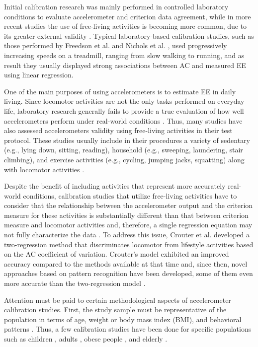 \documentclass[12pt]{article}
\begin{document}
Initial calibration research was mainly performed in controlled laboratory conditions to evaluate accelerometer and criterion data agreement, while in more recent studies the use of free-living activities is becoming more common, due to its greater external validity . Typical laboratory-based calibration studies, such as those performed by Freedson et al.  and Nichols et al. , used progressively increasing speeds on a treadmill, ranging from slow walking to running, and as result they usually displayed strong associations between AC and measured EE using linear regression.

One of the main purposes of using accelerometers is to estimate EE in daily living. Since locomotor activities are not the only tasks performed on everyday life, laboratory research generally fails to provide a true evaluation of how well accelerometers perform under real-world conditions . Thus, many studies have also assessed accelerometers validity using free-living activities in their test protocol. These studies usually include in their procedures a variety of sedentary (e.g., lying down, sitting, reading), household (e.g., sweeping, laundering, stair climbing), and exercise activities (e.g., cycling, jumping jacks, squatting) along with locomotor activities .

Despite the benefit of including activities that represent more accurately real-world conditions, calibration studies that utilize free-living activities have to consider that the relationship between the accelerometer output and the criterion measure for these activities is substantially different than that between criterion measure and locomotor activities and, therefore, a single regression equation may not fully characterize the data . To address this issue, Crouter et al.  developed a two-regression method that discriminates locomotor from lifestyle activities based on the AC coefficient of variation. Crouter's model exhibited an improved accuracy compared to the methods available at that time and, since then, novel approaches based on pattern recognition have been developed, some of them even more accurate than the two-regression model .

Attention must be paid to certain methodological aspects of accelerometer calibration studies. First, the study sample must be representative of the population in terms of age, weight or body mass index (BMI), and behavioral patterns . Thus, a few calibration studies have been done for specific populations such as children , adults , obese people , and elderly .
\end{document}

